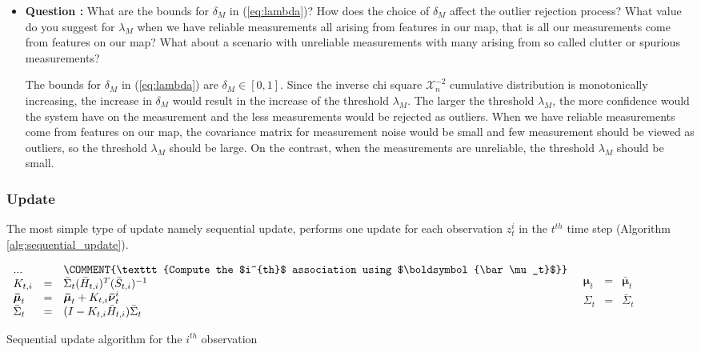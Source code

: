 \documentclass[11pt,a4paper]{article}
\begin{document}
\begin{itemize}
	\item \addtocounter{cnt_questions}{1} \textbf{Question :} What are the bounds for $\delta_M$ in (\ref{eq:lambda})? How does the choice of $\delta_M$ affect the outlier rejection process? What value do you suggest for $\lambda_M$ when we have reliable measurements all arising from features in our map, that is all our measurements come from features on our map? What about a scenario with unreliable measurements with many arising from so called clutter or spurious measurements?
		\par The bounds for $\delta_M$ in (\ref{eq:lambda}) are $\delta_{M} \in [0, 1]$. Since the inverse chi square $\mathcal{X}^{-2}_{n}$ cumulative distribution is monotonically increasing, the increase in $\delta_{M}$ would result in the increase of the threshold $\lambda_{M}$. The larger the threshold $\lambda_{M}$, the more confidence would the system have on the measurement and the less measurements would be rejected as outliers. When we have reliable measurements come from features on our map, the covariance matrix for measurement noise would be small and few measurement should be viewed as outliers, so the threshold $\lambda_{M}$ should be large. On the contrast, when the measurements are unreliable, the threshold $\lambda_{M}$ should be small.
\end{itemize}

\subsubsection{Update}
\par The most simple type of update namely sequential update, performs one update for each observation $z^i_t$ in the $t^{th}$ time step (Algorithm \ref{alg:sequential_update}).

\begin{algorithm}
	\begin{algorithmic}
	\STATE $
	\begin{array}{lll}
		...&&\COMMENT{\texttt{Compute the $i^{th}$ association using $\boldsymbol{\bar\mu_t}$}}\\
		K_{t,i} &=& \bar \Sigma_t (\bar H_{t,i})^T (\bar S_{t,i})^{-1}\\
		\boldsymbol{\bar\mu}_{t} &=& \boldsymbol{\bar\mu}_{t} + K_{t,i} \boldsymbol{\bar\nu}^i_t\\
		\bar\Sigma_t &=& (I-K_{t,i} \bar H_{t,i})\bar\Sigma_t
	\end{array}
	$
	\ENDFOR
	\STATE
	$
	\begin{array}{lll}
	\boldsymbol\mu_t &=& \boldsymbol{\bar\mu}_{t}\\
	\Sigma_t &=& \bar\Sigma_t
	\end{array}
	$
	\end{algorithmic}
	\caption{Sequential update algorithm for the $i^{th}$ observation}
	\label{alg:sequential_update}
\end{algorithm}
\end{document}
